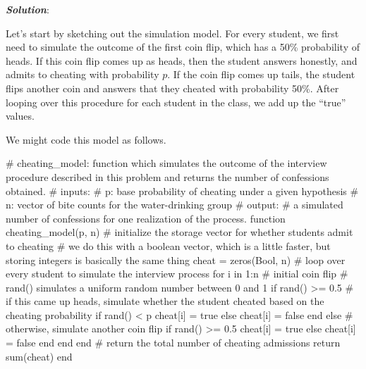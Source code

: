 \documentclass[
  letterpaper,
  DIV=11,
  numbers=noendperiod]{scrartcl}
\newenvironment{Shaded}{\begin{snugshade}}{\end{snugshade}}
\newcommand{\CommentTok}[1]{\textcolor[rgb]{0.37,0.37,0.37}{#1}}
\newcommand{\ConstantTok}[1]{\textcolor[rgb]{0.56,0.35,0.01}{#1}}
\newcommand{\ControlFlowTok}[1]{\textcolor[rgb]{0.00,0.23,0.31}{#1}}
\newcommand{\DataTypeTok}[1]{\textcolor[rgb]{0.68,0.00,0.00}{#1}}
\newcommand{\FloatTok}[1]{\textcolor[rgb]{0.68,0.00,0.00}{#1}}
\newcommand{\FunctionTok}[1]{\textcolor[rgb]{0.28,0.35,0.67}{#1}}
\newcommand{\KeywordTok}[1]{\textcolor[rgb]{0.00,0.23,0.31}{#1}}
\newcommand{\NormalTok}[1]{\textcolor[rgb]{0.00,0.23,0.31}{#1}}
\newcommand{\OperatorTok}[1]{\textcolor[rgb]{0.37,0.37,0.37}{#1}}
\begin{document}
\textbf{\emph{Solution}}:

Let's start by sketching out the simulation model. For every student, we
first need to simulate the outcome of the first coin flip, which has a
50\% probability of heads. If this coin flip comes up as heads, then the
student answers honestly, and admits to cheating with probability \(p\).
If the coin flip comes up tails, the student flips another coin and
answers that they cheated with probability 50\%. After looping over this
procedure for each student in the class, we add up the ``true'' values.

We might code this model as follows.

\begin{Shaded}
\begin{Highlighting}[]
\CommentTok{\# cheating\_model: function which simulates the outcome of the interview procedure described in this problem and returns the number of confessions obtained.}
\CommentTok{\# inputs:}
\CommentTok{\#   p: base probability of cheating under a given hypothesis}
\CommentTok{\#   n: vector of bite counts for the water{-}drinking group}
\CommentTok{\# output:}
\CommentTok{\#   a simulated number of confessions for one realization of the process.}
\KeywordTok{function} \FunctionTok{cheating\_model}\NormalTok{(p, n)}
    \CommentTok{\# initialize the storage vector for whether students admit to cheating}
    \CommentTok{\# we do this with a boolean vector, which is a little faster, but storing integers is basically the same thing}
\NormalTok{    cheat }\OperatorTok{=} \FunctionTok{zeros}\NormalTok{(}\DataTypeTok{Bool}\NormalTok{, n)}
    \CommentTok{\# loop over every student to simulate the interview process}
    \ControlFlowTok{for}\NormalTok{ i }\KeywordTok{in} \FloatTok{1}\OperatorTok{:}\NormalTok{n}
        \CommentTok{\# initial coin flip}
        \CommentTok{\# rand() simulates a uniform random number between 0 and 1}
        \ControlFlowTok{if} \FunctionTok{rand}\NormalTok{() }\OperatorTok{\textgreater{}=} \FloatTok{0.5}
            \CommentTok{\# if this came up heads, simulate whether the student cheated based on the cheating probability}
            \ControlFlowTok{if} \FunctionTok{rand}\NormalTok{() }\OperatorTok{\textless{}}\NormalTok{ p}
\NormalTok{                cheat[i] }\OperatorTok{=} \ConstantTok{true}
            \ControlFlowTok{else}
\NormalTok{                cheat[i] }\OperatorTok{=} \ConstantTok{false}
            \ControlFlowTok{end}
        \ControlFlowTok{else}
            \CommentTok{\# otherwise, simulate another coin flip}
            \ControlFlowTok{if} \FunctionTok{rand}\NormalTok{() }\OperatorTok{\textgreater{}=} \FloatTok{0.5}
\NormalTok{                cheat[i] }\OperatorTok{=} \ConstantTok{true}
            \ControlFlowTok{else}
\NormalTok{                cheat[i] }\OperatorTok{=} \ConstantTok{false}
            \ControlFlowTok{end}
        \ControlFlowTok{end}
    \ControlFlowTok{end}
    \CommentTok{\# return the total number of cheating admissions}
    \ControlFlowTok{return} \FunctionTok{sum}\NormalTok{(cheat)}
\KeywordTok{end}
\end{Highlighting}
\end{Shaded}
\end{document}
